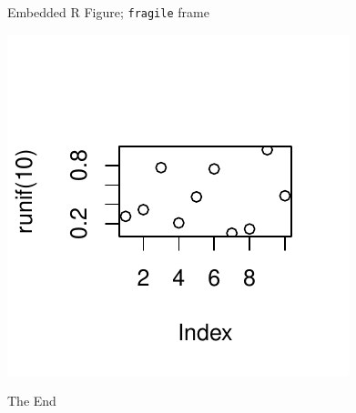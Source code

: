 \documentclass[12pt]{beamer}\usepackage[]{graphicx}\usepackage[]{color}
\makeatletter
\def\maxwidth{ %
  \ifdim\Gin@nat@width>\linewidth
    \linewidth
  \else
    \Gin@nat@width
  \fi
}
\newenvironment{knitrout}{}{} %
\makeatother
\begin{document}
\begin{frame}[fragile]{Embedded R Figure; \texttt{fragile} frame}
\begin{block}

\begin{knitrout}
\color{fgcolor}

{\centering \includegraphics[width=\maxwidth]{figure/unnamed-chunk-2-1} 

}



\end{knitrout}

\end{block}
\end{frame}

\begin{frame}
\Huge{\centerline{The End}}
\end{frame}

\end{document}
